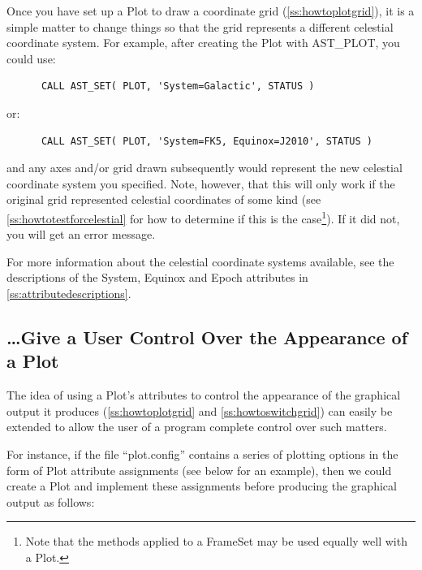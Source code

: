 \documentclass[twoside,11pt]{article}
\newcommand{\htmlref}[2]{#1}
\newcommand{\appref}[1]{Appendix~\ref{#1}}
\newcommand{\secref}[1]{\S\ref{#1}}
\renewcommand{\appref}[1]{\ref{#1}}
\renewcommand{\secref}[1]{\ref{#1}}
\begin{document}
Once you have set up a \htmlref{Plot}{Plot} to draw a coordinate grid
(\secref{ss:howtoplotgrid}), it is a simple matter to change things so
that the grid represents a different celestial coordinate system. For
example, after creating the Plot with \htmlref{AST\_PLOT}{AST_PLOT}, you could use:

\small
\begin{verbatim}
      CALL AST_SET( PLOT, 'System=Galactic', STATUS )
\end{verbatim}
\normalsize
or:
\small
\begin{verbatim}
      CALL AST_SET( PLOT, 'System=FK5, Equinox=J2010', STATUS )
\end{verbatim}
\normalsize

and any axes and/or grid drawn subsequently would represent the new
celestial coordinate system you specified.  Note, however, that this
will only work if the original grid represented celestial coordinates
of some kind (see \secref{ss:howtotestforcelestial} for how to
determine if this is the case\footnote{Note that the methods applied
to a \htmlref{FrameSet}{FrameSet} may be used equally well with a Plot.}). If it did not,
you will get an error message.

For more information about the celestial coordinate systems available,
see the descriptions of the \htmlref{System}{System}, \htmlref{Equinox}{Equinox} and \htmlref{Epoch}{Epoch} attributes in
\appref{ss:attributedescriptions}.

\subsection{\ldots Give a User Control Over the Appearance of a Plot}

The idea of using a \htmlref{Plot}{Plot}'s attributes to control the appearance of the
graphical output it produces (\secref{ss:howtoplotgrid} and
\secref{ss:howtoswitchgrid}) can easily be extended to allow the user
of a program complete control over such matters.

For instance, if the file ``plot.config'' contains a series of
plotting options in the form of Plot attribute assignments (see below
for an example), then we could create a Plot and implement these
assignments before producing the graphical output as follows:
\end{document}
